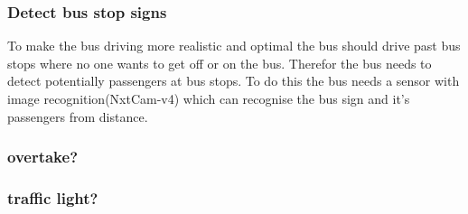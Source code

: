 \subsubsection{Detect bus stop signs}
To make the bus driving more realistic and optimal the bus should drive past bus stops where no one wants to get off or on the bus. Therefor the bus needs to detect potentially passengers at bus stops. To do this the bus needs a sensor with image recognition(NxtCam-v4) which can recognise the bus sign and it's passengers from distance.




\subsubsection{overtake?}
\subsubsection{traffic light?}



